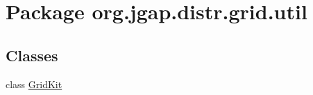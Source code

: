\hypertarget{namespaceorg_1_1jgap_1_1distr_1_1grid_1_1util}{\section{Package org.\-jgap.\-distr.\-grid.\-util}
\label{namespaceorg_1_1jgap_1_1distr_1_1grid_1_1util}
}
\subsection*{Classes}
\begin{DoxyCompactItemize}
\item 
class \hyperlink{classorg_1_1jgap_1_1distr_1_1grid_1_1util_1_1_grid_kit}{Grid\-Kit}
\end{DoxyCompactItemize}
